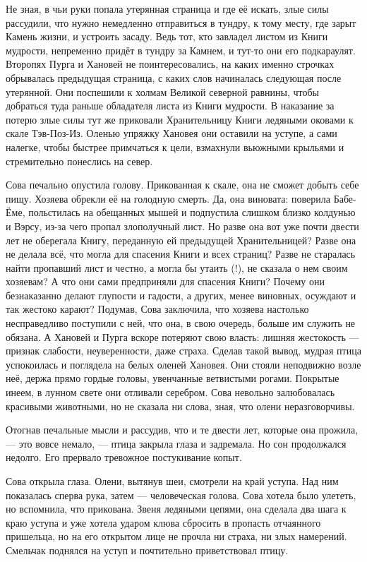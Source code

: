 \documentclass[oneside,final,14pt]{extreport}
\begin{document}
	Не зная, в чьи руки попала утерянная страница и где её искать, злые силы рассудили, что нужно немедленно отправиться в тундру, к тому месту, где зарыт Камень жизни, и устроить засаду. Ведь тот, кто завладел листом из Книги мудрости, непременно придёт в тундру за Камнем, и тут-то они его подкараулят. Второпях Пурга и Хановей не поинтересовались, на каких именно строчках обрывалась предыдущая страница, с каких слов начиналась следующая после утерянной. Они поспешили к холмам Великой северной равнины, чтобы добраться туда раньше обладателя листа из Книги мудрости. В наказание за потерю злые силы тут же приковали Хранительницу Книги ледяными оковами к скале Тэв-Поз-Из. Оленью упряжку Хановея они оставили на уступе, а сами налегке, чтобы быстрее примчаться к цели, взмахнули вьюжными крыльями и стремительно понеслись на север.
	
	Сова печально опустила голову. Прикованная к скале, она не сможет добыть себе пищу. Хозяева обрекли её на голодную смерть. Да, она виновата: поверила Бабе-Ёме, польстилась на обещанных мышей и подпустила слишком близко колдунью и Вэрсу, из-за чего пропал злополучный лист. Но разве она вот уже почти двести лет не оберегала Книгу, переданную ей предыдущей Хранительницей? Разве она не делала всё, что могла для спасения Книги и всех страниц? Разве не старалась найти пропавший лист и честно, а могла бы утаить (!), не сказала о нем своим хозяевам? А что они сами предприняли для спасения Книги? Почему они безнаказанно делают глупости и гадости, а других, менее виновных, осуждают и так жестоко карают? Подумав, Сова заключила, что хозяева настолько несправедливо поступили с ней, что она, в свою очередь, больше им служить не обязана. А Хановей и Пурга вскоре потеряют свою власть: лишняя жестокость — признак слабости, неуверенности, даже страха. Сделав такой вывод, мудрая птица успокоилась и поглядела на белых оленей Хановея. Они стояли неподвижно возле неё, держа прямо гордые головы, увенчанные ветвистыми рогами. Покрытые инеем, в лунном свете они отливали серебром. Сова невольно залюбовалась красивыми животными, но не сказала ни слова, зная, что олени неразговорчивы.
	
	Отогнав печальные мысли и рассудив, что и те двести лет, которые она прожила, — это вовсе немало, — птица закрыла глаза и задремала. Но сон продолжался недолго. Его прервало тревожное постукивание копыт.
	
	Сова открыла глаза. Олени, вытянув шеи, смотрели на край уступа. Над ним показалась сперва рука, затем — человеческая голова. Сова хотела было улететь, но вспомнила, что прикована. Звеня ледяными цепями, она сделала два шага к краю уступа и уже хотела ударом клюва сбросить в пропасть отчаянного пришельца, но на его открытом лице не прочла ни страха, ни злых намерений. Смельчак поднялся на уступ и почтительно приветствовал птицу.
	
\end{document}
